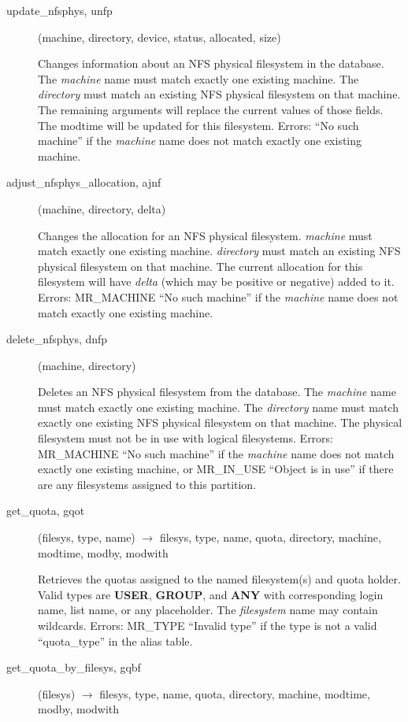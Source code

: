 \documentclass{article}
\begin{document}
\begin{description}
\item[update\_nfsphys, unfp](machine, directory, device, status,
allocated, size)

Changes information about an NFS physical filesystem in the database.
The {\em machine} name must match exactly one existing machine.  The
{\em directory} must match an existing NFS physical filesystem on that
machine.  The remaining arguments will replace the current values of
those fields.  The modtime will be updated for this filesystem.
Errors: ``No such machine'' if the {\em machine} name does not match
exactly one existing machine.

\item[adjust\_nfsphys\_allocation, ajnf](machine, directory, delta)

Changes the allocation for an NFS physical filesystem.  {\em machine}
must match exactly one existing machine.  {\em directory} must match an
existing NFS physical filesystem on that machine.  The current
allocation for this filesystem will have {\em delta} (which may be
positive or negative) added to it.  Errors: MR\_MACHINE ``No such
machine'' if the {\em machine} name does not match exactly one existing
machine.

\item[delete\_nfsphys, dnfp](machine, directory)

Deletes an NFS physical filesystem from the database.  The {\em machine}
name must match exactly one existing machine.  The {\em directory} name must
match exactly one existing NFS physical filesystem on that machine.
The physical filesystem must not be in use with logical filesystems.
Errors: MR\_MACHINE ``No such machine'' if the {\em machine} name does not
match exactly one existing machine, or MR\_IN\_USE ``Object is in use''
if there are any filesystems assigned to this partition.

\item[get\_quota, gqot](filesys, type, name) $\rightarrow$ filesys,
type, name, quota, directory, machine, modtime, modby, modwith

Retrieves the quotas assigned to the named filesystem(s) and quota
holder.  Valid types are {\bf USER}, {\bf GROUP}, and {\bf ANY} with
corresponding login name, list name, or any placeholder.  The
{\em filesystem} name may contain wildcards.  Errors: MR\_TYPE ``Invalid
type'' if the type is not a valid ``quota\_type'' in the alias table.

\item[get\_quota\_by\_filesys, gqbf](filesys) $\rightarrow$ filesys,
type, name, quota, directory, machine, modtime, modby, modwith


\end{description}
\end{document}
